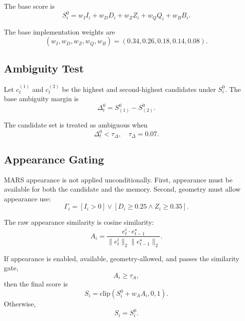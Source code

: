The base score is
\begin{equation}
S_i^{0}
=
w_I I_i
+
w_D D_i
+
w_Z Z_i
+
w_Q Q_i
+
w_B B_i.
\end{equation}

The base implementation weights are
\begin{equation}
(w_I,w_D,w_Z,w_Q,w_B)
=
(0.34,0.26,0.18,0.14,0.08).
\end{equation}

\subsection{Ambiguity Test}

Let $c_t^{(1)}$ and $c_t^{(2)}$ be the highest and second-highest candidates under $S_i^0$. The base ambiguity margin is
\begin{equation}
\Delta_t^0 = S_{(1)}^0 - S_{(2)}^0.
\end{equation}

The candidate set is treated as ambiguous when
\begin{equation}
\Delta_t^0 < \tau_\Delta,
\quad
\tau_\Delta = 0.07.
\end{equation}

\subsection{Appearance Gating}

MARS appearance is not applied unconditionally. First, appearance must be available for both the candidate and the memory. Second, geometry must allow appearance use:
\begin{equation}
\Gamma_i =
[I_i > 0]
\lor
[D_i \geq 0.25 \land Z_i \geq 0.35].
\end{equation}

The raw appearance similarity is cosine similarity:
\begin{equation}
A_i =
\frac{e_t^i \cdot e_{t-1}^\star}
{\lVert e_t^i \rVert_2 \lVert e_{t-1}^\star \rVert_2}.
\end{equation}

If appearance is enabled, available, geometry-allowed, and passes the similarity gate,
\begin{equation}
A_i \geq \tau_A,
\end{equation}
then the final score is
\begin{equation}
S_i = \mathrm{clip}(S_i^0 + w_A A_i,0,1).
\end{equation}
Otherwise,
\begin{equation}
S_i = S_i^0.
\end{equation}

